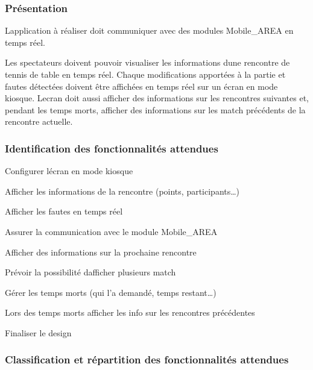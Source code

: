 \subsubsection*{Présentation}

L\textquotesingle{}application à réaliser doit communiquer avec des modules Mobile\+\_\+\+A\+R\+EA en temps réel.

Les spectateurs doivent pouvoir visualiser les informations d\textquotesingle{}une rencontre de tennis de table en temps réel. Chaque modifications apportées à la partie et fautes détectées doivent être affichées en temps réel sur un écran en mode kiosque. L\textquotesingle{}ecran doit aussi afficher des informations sur les rencontres suivantes et, pendant les temps morts, afficher des informations sur les match précédents de la rencontre actuelle.

\subsubsection*{Identification des fonctionnalités attendues}


\begin{DoxyItemize}
\item Configurer l\textquotesingle{}écran en mode kiosque
\item Afficher les informations de la rencontre (points, participants…)
\item Afficher les fautes en temps réel
\item Assurer la communication avec le module Mobile\+\_\+\+A\+R\+EA
\item Afficher des informations sur la prochaine rencontre
\item Prévoir la possibilité d\textquotesingle{}afficher plusieurs match
\item Gérer les temps morts (qui l’a demandé, temps restant…)
\item Lors des temps morts afficher les info sur les rencontres précédentes
\item Finaliser le design
\end{DoxyItemize}

\subsubsection*{Classification et répartition des fonctionnalités attendues}


